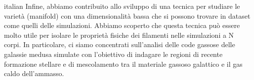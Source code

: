 \begin{otherlanguage*}{italian}
Infine, abbiamo contribuito allo sviluppo di una tecnica per studiare le varietà (manifold) con una dimensionalità bassa che si possono trovare in dataset come quelli delle simulazioni.
Abbiamo scoperto che questa tecnica può essere molto utile per isolare le proprietà fisiche dei filamenti nelle simulazioni a N corpi.
In particolare, ci siamo concentrati sull'analisi delle code gassose delle galassie medusa simulate con l'obiettivo di indagare le regioni di recente formazione stellare e di mescolamento tra il materiale gassoso galattico e il gas caldo dell'ammasso.
\end{otherlanguage*}

